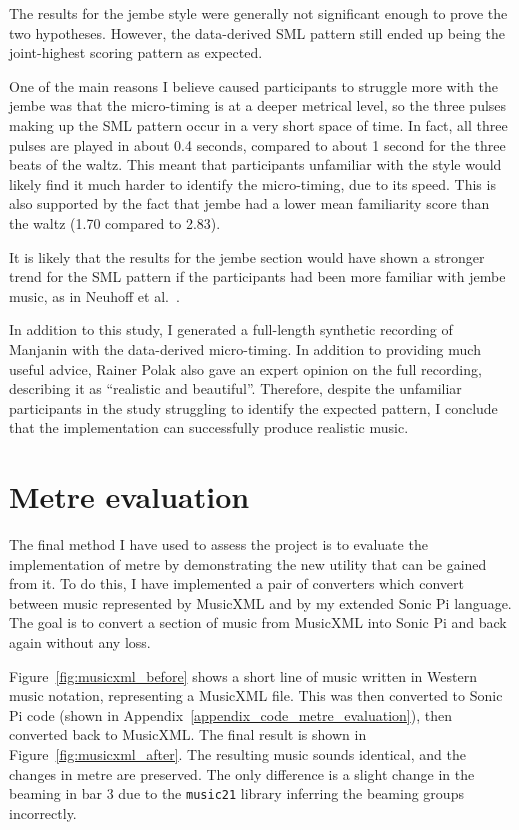 \documentclass[12pt,twoside,openright]{report}
\begin{document}
The results for the jembe style were generally not significant enough to prove
the two hypotheses. However, the data-derived SML pattern still ended up being
the joint-highest scoring pattern as expected.

One of the main reasons I believe caused participants to struggle more with the
jembe was that the micro-timing is at a deeper metrical level, so the three
pulses making up the SML pattern occur in a very short space of time. In fact, all three pulses are
played in about 0.4 seconds, compared to about 1 second for the three beats of
the waltz. This meant that participants unfamiliar with the style would likely
find it much harder to identify the micro-timing, due to its speed. This is also
supported by the fact that jembe had a lower mean familiarity score than the
waltz (1.70 compared to 2.83).

It is likely that the results for the jembe section would have shown a stronger
trend for the SML pattern if the participants had been more familiar with jembe
music, as in Neuhoff et al.\ \cite{neuhoff2017}.

In addition to this study, I generated a full-length synthetic recording of
Manjanin with the data-derived micro-timing. In addition to providing much
useful advice, Rainer Polak also gave an expert opinion on the full recording,
describing it as ``realistic and beautiful''. Therefore, despite the unfamiliar
participants in the study struggling to identify the expected pattern, I conclude that the implementation can successfully produce realistic music.
\newpage



\section{Metre evaluation} \label{metre_evaluation}

The final method I have used to assess the project is to evaluate the
implementation of metre by demonstrating the new utility that can be gained from
it. To do this, I have implemented a pair of converters which convert between
music represented by MusicXML and by my extended Sonic Pi language. The goal is
to convert a section of music from MusicXML into Sonic Pi and back again without
any loss.

Figure~\ref{fig:musicxml_before} shows a short line of music written in Western music notation,
representing a MusicXML file. This was then converted to Sonic Pi code (shown in
Appendix~\ref{appendix_code_metre_evaluation}), then converted back to MusicXML. The final result is
shown in Figure~\ref{fig:musicxml_after}. The resulting music sounds identical, and the changes in
metre are preserved. The only difference is a slight change in the beaming in
bar 3 due to the \verb'music21' library inferring the beaming groups incorrectly.
\end{document}
